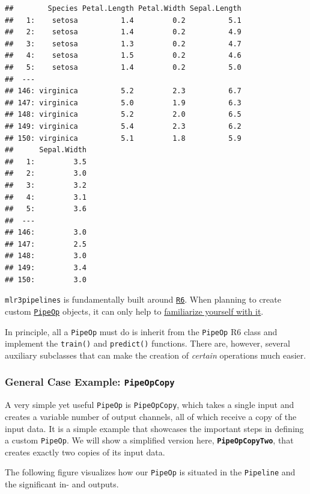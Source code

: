 \documentclass[]{article}
\begin{document}
\begin{verbatim}
##        Species Petal.Length Petal.Width Sepal.Length
##   1:    setosa          1.4         0.2          5.1
##   2:    setosa          1.4         0.2          4.9
##   3:    setosa          1.3         0.2          4.7
##   4:    setosa          1.5         0.2          4.6
##   5:    setosa          1.4         0.2          5.0
##  ---                                                
## 146: virginica          5.2         2.3          6.7
## 147: virginica          5.0         1.9          6.3
## 148: virginica          5.2         2.0          6.5
## 149: virginica          5.4         2.3          6.2
## 150: virginica          5.1         1.8          5.9
##      Sepal.Width
##   1:         3.5
##   2:         3.0
##   3:         3.2
##   4:         3.1
##   5:         3.6
##  ---            
## 146:         3.0
## 147:         2.5
## 148:         3.0
## 149:         3.4
## 150:         3.0
\end{verbatim}

\texttt{mlr3pipelines} is fundamentally built around \href{https://r6.r-lib.org/}{\texttt{R6}}. When planning to create custom \href{https://mlr3pipelines.mlr-org.com/reference/PipeOp.html}{\texttt{PipeOp}} objects, it can only help to \href{https://adv-r.hadley.nz/r6.html}{familiarize yourself with it}.

In principle, all a \texttt{PipeOp} must do is inherit from the \texttt{PipeOp} R6 class and implement the \texttt{train()} and \texttt{predict()} functions.
There are, however, several auxiliary subclasses that can make the creation of \emph{certain} operations much easier.

\hypertarget{ext-pipeopcopy}{%
\subsubsection{\texorpdfstring{General Case Example: \texttt{PipeOpCopy}}{General Case Example: PipeOpCopy}}\label{ext-pipeopcopy}}

A very simple yet useful \texttt{PipeOp} is \texttt{PipeOpCopy}, which takes a single input and creates a variable number of output channels, all of which receive a copy of the input data.
It is a simple example that showcases the important steps in defining a custom \texttt{PipeOp}.
We will show a simplified version here, \textbf{\texttt{PipeOpCopyTwo}}, that creates exactly two copies of its input data.

The following figure visualizes how our \texttt{PipeOp} is situated in the \texttt{Pipeline} and the significant in- and outputs.
\end{document}
